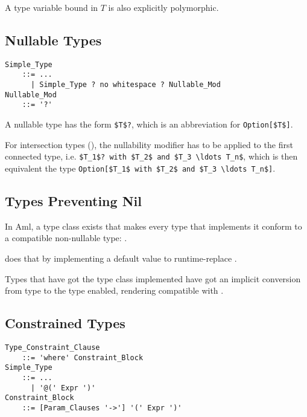 A type variable bound in $T$ is also explicitly polymorphic. 





\subsection{Nullable Types}
\label{sec:nullable-types}

\grammar\begin{lstlisting}[deletekeywords={no}]
Simple_Type
    ::= ...
      | Simple_Type ? no whitespace ? Nullable_Mod
Nullable_Mod 
    ::= '?'
\end{lstlisting}

A nullable type has the form \lstinline!$T$?!, which is an abbreviation for \lstinline!Option[$T$]!.

For intersection types (), the nullability modifier has to be applied to the first connected type, i.e. \lstinline!$T_1$? with $T_2$ and $T_3 \ldots T_n$!, which is then equivalent the type \lstinline!Option[$T_1$ with $T_2$ and $T_3 \ldots T_n$]!. 





\subsection{Types Preventing Nil}
\label{sec:types-preventing-nil}

In Aml, a type class exists that makes every type that implements it conform to a compatible non-nullable type: . 

 does that by implementing a default value to runtime-replace . 

Types  that have got the  type class implemented have got an implicit conversion from type  to the type  enabled, rendering  compatible with .








\subsection{Constrained Types}
\label{sec:constrained-types}

\grammar\begin{lstlisting}
Type_Constraint_Clause 
    ::= 'where' Constraint_Block
Simple_Type
    ::= ...
      | '@(' Expr ')'
Constraint_Block 
    ::= [Param_Clauses '->'] '(' Expr ')'
\end{lstlisting}

